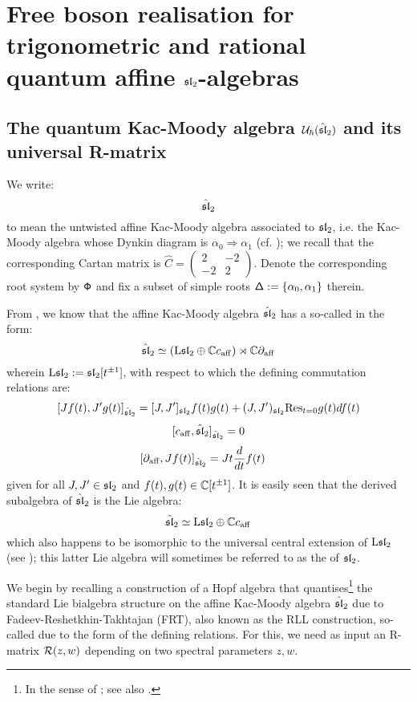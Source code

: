 \section{\texorpdfstring{Free boson realisation for trigonometric and rational quantum affine $\sl_2$-algebras}{}}
    \subsection{\texorpdfstring{The quantum Kac-Moody algebra $\calU_{\hbar}(\hat{\sl}_2)$ and its universal R-matrix}{}}
        We write:
            $$\hat{\sl}_2$$
        to mean the untwisted affine Kac-Moody algebra associated to $\sl_2$, i.e. the Kac-Moody algebra whose Dynkin diagram is $\alpha_0 \Rightarrow \alpha_1$ (cf. \cite[Chapters 4 and 7]{kac_infinite_dimensional_lie_algebras}); we recall that the corresponding Cartan matrix is $\hat{C} = \begin{pmatrix} 2 & -2 \\ -2 & 2 \end{pmatrix}$. Denote the corresponding root system by $\rootsystem$ and fix a subset of simple roots $\simpleroots := \{\alpha_0, \alpha_1\}$ therein.
        
        From \cite[Chapter 7]{kac_infinite_dimensional_lie_algebras}, we know that the affine Kac-Moody algebra $\hat{\sl}_2$ has a so-called  in the form:
            $$\hat{\sl}_2 \cong ( \Loop \sl_2 \oplus \bbC c_{\aff} ) \rtimes \bbC \del_{\aff}$$
        wherein $\Loop \sl_2 := \sl_2[t^{\pm 1}]$, with respect to which the defining commutation relations are:
            $$[J f(t), J'g(t)]_{\hat{\sl}_2} = [J, J']_{\sl_2} f(t) g(t) + (J, J')_{\sl_2} \Res_{t = 0} g(t) df(t)$$
            $$[c_{\aff}, \hat{\sl}_2]_{\hat{\sl}_2} = 0$$
            $$[\del_{\aff}, J f(t)]_{\hat{\sl}_2} = J t\frac{d}{dt} f(t) \quad$$
        given for all $J, J' \in \sl_2$ and $f(t), g(t) \in \bbC[t^{\pm 1}]$. It is easily seen that the derived subalgebra of $\hat{\sl}_2$ is the Lie algebra:
            $$\tilde{\sl}_2 \cong \Loop \sl_2 \oplus \bbC c_{\aff}$$
        which also happens to be isomorphic to the universal central extension of $\Loop \sl_2$ (see \cite{kassel_universal_central_extensions_of_lie_algebras}); this latter Lie algebra will sometimes be referred to as the  of $\sl_2$.
    
        We begin by recalling a construction of a Hopf algebra that quantises\footnote{In the sense of \cite{etingof_kazhdan_quantisation_1}; see also \cite{etingof_kazhdan_quantisation_6}.} the standard Lie bialgebra structure on the affine Kac-Moody algebra $\hat{\sl}_2$ due to Fadeev-Reshetkhin-Takhtajan (FRT), also known as the RLL construction, so-called due to the form of the defining relations. For this, we need as input an R-matrix $\calR(z, w)$ depending on two spectral parameters $z, w$.

